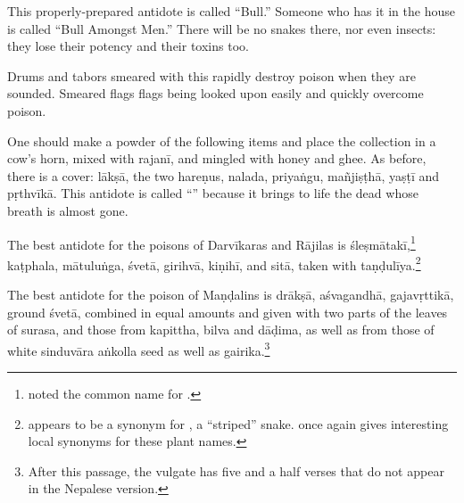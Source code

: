 \begin{translation}
This properly-prepared antidote is called “Bull.” Someone who 
has it in the house is called “Bull Amongst Men.”  
There will be no snakes there, nor even insects: they lose their potency and 
their toxins too. 

\item [72cd--73ab]

Drums and tabors smeared with
this rapidly destroy poison when they are sounded.
Smeared flags flags being looked upon easily and quickly
overcome poison.

\item [73ab--75ab] 

    One should make a powder of the following items and
place the collection in a cow's horn, mixed with \gls{rajanī}, and mingled with 
honey and ghee.  As before, there is a cover: \gls{lākṣā},
    the two \glspl{hareṇu}, \gls{nalada}, \gls{priyaṅgu}, \gls{mañjiṣṭhā},
    \gls{yaṣṭī} and \gls{pṛthvīkā}. 
        This antidote is
    called “” because it  brings to life the 
    dead whose breath is almost gone.
\item [75cd--76ab]

    The best antidote for the poisons of Darvīkaras and Rājilas is
\gls{śleṣmātakī},\footnote{ noted the common name
     for .}
\gls{kaṭphala},
\gls{mātuluṅga},
\gls{śvetā}, %
\gls{girihvā}, %
\gls{kiṇihī},
and \gls{sitā}, 
taken with \gls{taṇḍulīya}.\footnote{ appears to be a synonym
    for , a “striped” snake.  once 
    again gives interesting local synonyms for these plant names.}

\item[76cd--78ab]

    The best antidote for the poison of Maṇḍalins is
\gls{drākṣā},
\gls{aśvagandhā},
\gls{gajavṛttikā},
ground \gls{śvetā},
combined in equal amounts and given with 
two parts of the leaves of 
\gls{surasa}, and those from
\gls{kapittha},
\gls{bilva} 
and 
\gls{dāḍima}, 
as well as  from those of
white \gls{sinduvāra}
\gls{aṅkolla} seed
as well as 
\gls{gairika}.\footnote{After this passage, the vulgate has five and a half verses
    that do not appear in the Nepalese version.}


\end{translation}
